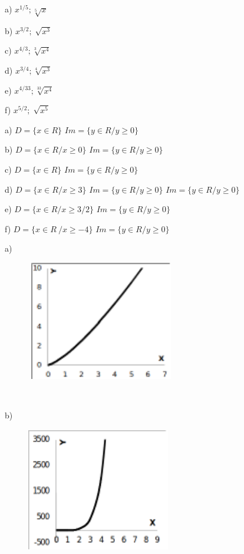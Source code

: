 \begin{respostas}{2}
	\begin{multicols}{2}
	\ansitem{} 
		a) \( x^{1/5};\sqrt[5]{x} \)
	
		b) \( x^{3/2};\sqrt[]{x^{3}} \)  

		c) \( x^{4/3};\sqrt[3]{x^{4}} \)
	
		d) \( x^{3/4};\sqrt[4]{x^{3}} \)

		e) \( x^{4/33};\sqrt[33]{x^{4}} \)
	
		f) \( x^{5/2};\sqrt[]{x^{5}} \) 
	\end{multicols}

	\ansitem{}  a)  \( D= \{ x \in R \} \) \( Im= \{ y \in R/y \geq 0 \}  \) 

	b) \( D= \{ x \in R/x \geq 0 \}  \) \( Im= \{ y \in R/y \geq 0 \} \)

	c) \( D= \{ x \in R \}  \) \( Im= \{ y \in R/y \geq 0 \}  \)

	d) \( D= \{ x \in R/x \geq 3 \}  \) \( Im= \{ y \in R/y \geq 0 \}  \) \( Im= \{ y \in R/y \geq 0 \}  \) 

	e) \( D= \{ x \in R/x \geq 3/2  \}  \) \( Im= \{ y \in R/y \geq 0 \}  \) 

	f)  \( D= \{ x \in R~/x \geq -4 \} \) \( Im= \{ y \in R/y \geq 0 \}  \)
	
\ansitem{} a) \quad

\begin{figure}[H]
	\begin{Center}
		\includegraphics[width=2.57in,height=2.05in]{capitulos/outras_funcoes/media/image34.pdf}
	\end{Center}
\end{figure}

~~

b)\quad 

\begin{figure}[H]
	\begin{Center}
		\includegraphics[width=2.47in,height=2.14in]{capitulos/outras_funcoes/media/image35.pdf}
	\end{Center}
\end{figure}


\end{respostas}
